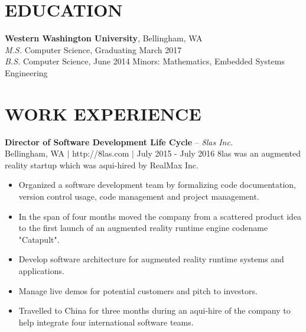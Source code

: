 \documentclass[line,margin]{res}
\begin{document}
\address{425.241.7977 $|$ kyle@kylerader.ninja $|$ https://kylerader.ninja $|$ github.com/kyle-rader}

\begin{resume}
 
\section{EDUCATION}
    {\bf Western Washington University}, Bellingham, WA \\
    {\sl M.S.} Computer Science, {\small Graduating March 2017} \\
    {\sl B.S.} Computer Science, {\small June 2014} Minors: Mathematics, Embedded Systems Engineering

\section{WORK EXPERIENCE}



    {\bf Director of Software Development Life Cycle} -- {\sl 8las Inc.} \\
    {\footnotesize Bellingham, WA $|$ http://8las.com $|$ July 2015 - July 2016}
    8las was an augmented reality startup which was aqui-hired by RealMax Inc.
    \begin{itemize} \itemsep -2pt
        \item Organized a software development team by formalizing code documentation,
            version control usage, code management and project management.
        \item In the span of four months moved the company from a scattered product idea to the first launch of an augmented reality runtime engine codename "Catapult".
        \item Develop software architecture for augmented reality runtime systems and applications.
        \item Manage live demos for potential customers and pitch to investors.
        \item Travelled to China for three months during an aqui-hire of the company to help integrate four international software teams.
    \end{itemize}


\end{resume}
\end{document}

